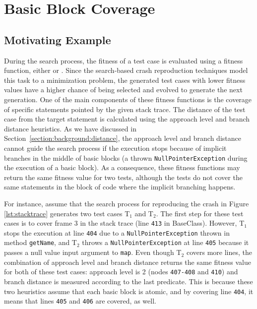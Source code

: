 
\section{Basic Block Coverage}
\label{section:bbc:approach}

\subsection{Motivating Example} 

During the search process, the fitness of a test case is evaluated using a fitness function, either \WS or \integ. Since the search-based crash reproduction techniques model this task to a minimization problem, the generated test cases with lower fitness values have a higher chance of being selected and evolved to generate the next generation.
One of the main components of these fitness functions is the coverage of specific statements pointed by the given stack trace. The distance of the test case from the target statement is calculated using the approach level and branch distance heuristics. As we have discussed in Section~\ref{section:background:distance}, the approach level and branch distance cannot guide the search process if the execution stops because of implicit branches in the middle of basic blocks (\eg a thrown \texttt{NullPointerException} during the execution of a basic block). As a consequence, these fitness functions may return the same fitness value for two tests, although the tests do not cover the same statements in the block of code where the implicit branching happens.

For instance, assume that the search process for reproducing the crash in Figure \ref{lst:stacktrace} generates two test cases T$_1$ and T$_2$. The first step for these test cases is to cover frame 3 in the stack trace (line \texttt{413} in BaseClass). However, T$_1$ stops the execution at line \texttt{404} due to a \texttt{NullPointerException} thrown in method \texttt{getName}, and T$_2$ throws a \texttt{NullPoint\-erException} at line \texttt{405} because it passes a null value input argument to \texttt{map}.
Even though T$_2$  covers more lines, the combination of approach level and branch distance returns the same fitness value for both of these test cases: approach level is 2 (nodes \texttt{407-408} and \texttt{410}) and branch distance is measured according to the last predicate. This is because these two heuristics assume that each basic block is atomic, and by covering line \texttt{404}, it means that lines \texttt{405} and \texttt{406} are covered, as well.

